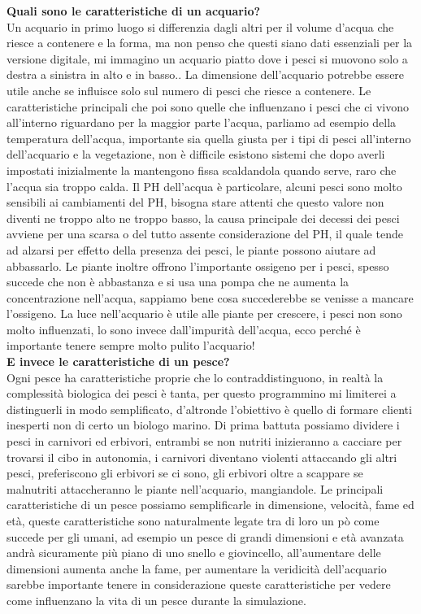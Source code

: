 \documentclass[12pt,a4paper,oneside,article]{article}
\begin{document}
	{\large \textbf{Quali sono le caratteristiche di un acquario?}}\\
	Un acquario in primo luogo si differenzia dagli altri per il volume d'acqua che riesce a contenere e la forma, ma non penso che questi siano dati essenziali per la versione digitale, mi immagino un acquario piatto dove i pesci si muovono solo a destra a sinistra in alto e in basso.. La dimensione dell'acquario potrebbe essere utile anche se influisce solo sul numero di pesci che riesce a contenere. Le caratteristiche principali che poi sono quelle che influenzano i pesci che ci vivono all'interno riguardano per la maggior parte l'acqua, parliamo ad esempio della temperatura dell'acqua, importante sia quella giusta per i tipi di pesci all'interno dell'acquario e la vegetazione, non è difficile esistono sistemi che dopo averli impostati inizialmente la mantengono fissa scaldandola quando serve, raro che l'acqua sia troppo calda. Il PH dell'acqua è particolare, alcuni pesci sono molto sensibili ai cambiamenti del PH, bisogna stare attenti che questo valore non diventi ne troppo alto ne troppo basso, la causa principale dei decessi dei pesci avviene per una scarsa o del tutto assente considerazione del PH, il quale tende ad alzarsi per effetto della presenza dei pesci, le piante possono aiutare ad abbassarlo. Le piante inoltre offrono l'importante ossigeno per i pesci, spesso succede che non è abbastanza e si usa una pompa che ne aumenta la concentrazione nell'acqua, sappiamo bene cosa succederebbe se venisse a mancare l'ossigeno. La luce nell'acquario è utile alle piante per crescere, i pesci non sono molto influenzati, lo sono invece dall'impurità dell'acqua, ecco perché è importante tenere sempre molto pulito l'acquario!
	\\
	
	{\large \textbf{E invece le caratteristiche di un pesce?}}\\
	Ogni pesce ha caratteristiche proprie che lo contraddistinguono, in realtà la complessità biologica dei pesci è tanta, per questo programmino mi limiterei a distinguerli in modo semplificato, d'altronde l'obiettivo è quello di formare clienti inesperti non di certo un biologo marino. Di prima battuta possiamo dividere i pesci in carnivori ed erbivori, entrambi se non nutriti inizieranno a cacciare per trovarsi il cibo in autonomia, i carnivori diventano violenti attaccando gli altri pesci, preferiscono gli erbivori se ci sono, gli erbivori oltre a scappare se malnutriti attaccheranno le piante nell'acquario, mangiandole. Le principali caratteristiche di un pesce possiamo semplificarle in dimensione, velocità, fame ed età, queste caratteristiche sono naturalmente legate tra di loro un pò come succede per gli umani, ad esempio un pesce di grandi dimensioni e età avanzata andrà sicuramente più piano di uno snello e giovincello, all'aumentare delle dimensioni aumenta anche la fame, per aumentare la veridicità dell'acquario sarebbe importante tenere in considerazione queste caratteristiche per vedere come influenzano la vita di un pesce durante la simulazione.
	\\
	
\end{document}
